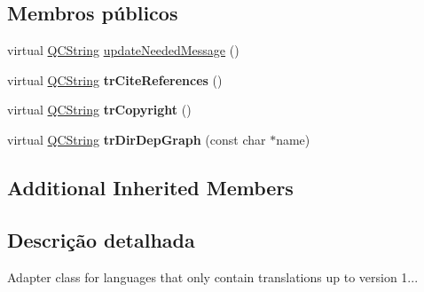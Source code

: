 \subsection*{Membros públicos}
\begin{DoxyCompactItemize}
\item 
virtual \hyperlink{class_q_c_string}{Q\-C\-String} \hyperlink{class_translator_adapter__1__7__5_aa2c053398a494e36caf5152d9a4fc6cf}{update\-Needed\-Message} ()
\item 
\hypertarget{class_translator_adapter__1__7__5_ae43b2c6dbb1637144e32cd13a0d4704c}{virtual \hyperlink{class_q_c_string}{Q\-C\-String} {\bfseries tr\-Cite\-References} ()}\label{class_translator_adapter__1__7__5_ae43b2c6dbb1637144e32cd13a0d4704c}

\item 
\hypertarget{class_translator_adapter__1__7__5_a840474c30dfc2d4e92d1a29c5d1bf343}{virtual \hyperlink{class_q_c_string}{Q\-C\-String} {\bfseries tr\-Copyright} ()}\label{class_translator_adapter__1__7__5_a840474c30dfc2d4e92d1a29c5d1bf343}

\item 
\hypertarget{class_translator_adapter__1__7__5_abbe522be6eed72f54409458a1896323c}{virtual \hyperlink{class_q_c_string}{Q\-C\-String} {\bfseries tr\-Dir\-Dep\-Graph} (const char $\ast$name)}\label{class_translator_adapter__1__7__5_abbe522be6eed72f54409458a1896323c}

\end{DoxyCompactItemize}
\subsection*{Additional Inherited Members}


\subsection{Descrição detalhada}
Adapter class for languages that only contain translations up to version 1... 

